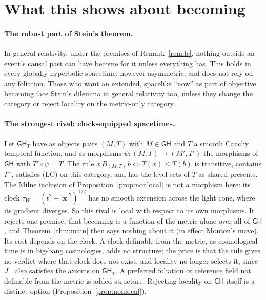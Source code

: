 \documentclass[11pt]{article}
\theoremstyle{definition}
\newcommand{\GH}{\mathsf{GH}}
\newcommand{\Ichr}{I^{-}}
\newcommand{\Jm}{J^{-}}
\begin{document}
\section{What this shows about becoming}\label{sec:phil}

\paragraph{The robust part of Stein's theorem.} In general relativity, under
the premises of Remark~\ref{rem:lc}, nothing outside an event's causal past
can have become for it unless everything has. This holds in every globally
hyperbolic spacetime, however asymmetric, and does not rely on any foliation.
Those who want an extended, spacelike ``now'' as part of objective becoming
face Stein's dilemma in general relativity too, unless they change the
category or reject locality on the metric-only category.

\paragraph{The strongest rival: clock-equipped spacetimes.} Let $\GH_T$ have as
objects pairs $(M,T)$ with $M\in\GH$ and $T$ a smooth Cauchy temporal function, and
as morphisms $\psi:(M,T)\to(M',T')$ the morphisms of $\GH$ with $T'\circ\psi=T$. The
rule $x\,B_{(M,T)}\,b\iff T(x)\le T(b)$ is transitive, contains $\Ichr$, satisfies
(LC) on this category, and has the level sets of $T$ as shared presents. The
Milne inclusion of Proposition~\ref{prop:nonlocal} is not a morphism here: its
clock $\tau_W=(t^2-|\mathbf x|^2)^{1/2}$ has no smooth extension across the light
cone, where its gradient diverges. So this rival is local with respect to
its own morphisms. It rejects one premise, that becoming is a function of the
metric alone over all of $\GH$, and Theorem~\ref{thm:main} then says nothing about
it (in effect Monton's move). Its cost depends on the clock. A clock definable
from the metric, as cosmological time is in big-bang cosmologies, adds no
structure; the price is that the rule gives no verdict where that clock does
not exist, and locality no longer selects it, since $\Jm$ also satisfies the
axioms on $\GH_T$. A preferred foliation or reference field not definable
from the metric is added structure. Rejecting locality on $\GH$ itself is a
distinct option (Proposition~\ref{prop:nonlocal}).
\end{document}

